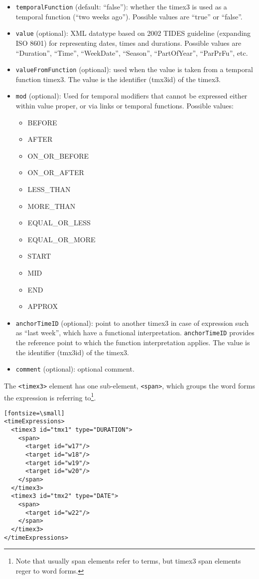 \begin{itemize}
\begin{tabular}{|c|p{9cm}|}
  \end{tabular}

\item \texttt{temporalFunction} (default: ``false''): whether the timex3 is
  used as a temporal function (``two weeks ago''). Possible values are
  ``true'' or ``false''.

\item \texttt{value} (optional): XML datatype based on 2002 TIDES guideline
  (expanding ISO 8601) for representing dates, times and durations. Possible
  values are ``Duration'', ``Time'', ``WeekDate'', ``Season'',
  ``PartOfYear'', ``ParPrFu'', etc.

\item \texttt{valueFromFunction} (optional): used when the value is taken
  from a temporal function timex3. The value is the identifier (tmx3id) of
  the timex3.

\item \texttt{mod} (optional): Used for temporal modifiers that cannot be
  expressed either within value proper, or via links or temporal
  functions. Possible values:
  \begin{itemize}
  \item BEFORE
  \item AFTER
  \item ON\_OR\_BEFORE
  \item ON\_OR\_AFTER
  \item LESS\_THAN
  \item MORE\_THAN
  \item EQUAL\_OR\_LESS
  \item EQUAL\_OR\_MORE
  \item START
  \item MID
  \item END
  \item APPROX
  \end{itemize}

\item \texttt{anchorTimeID} (optional): point to another timex3 in case of
  expression such as ``last week'', which have a functional
  interpretation. \texttt{anchorTimeID} provides the reference point to
  which the function interpretation applies. The value is the identifier
  (tmx3id) of the timex3.
\item \texttt{comment} (optional): optional comment.
\end{itemize}

The \texttt{<timex3>} element has one sub-element, \texttt{<span>}, which
groups the word forms the expression is referring to\footnote{Note that
  usually span elements refer to terms, but timex3 span elements reger to
  word forms.}.

\begin{verbatim}[fontsize=\small]
<timeExpressions>
  <timex3 id="tmx1" type="DURATION">
    <span>
      <target id="w17"/>
      <target id="w18"/>
      <target id="w19"/>
      <target id="w20"/>
    </span>
  </timex3>
  <timex3 id="tmx2" type="DATE">
    <span>
      <target id="w22"/>
    </span>
  </timex3>
</timeExpressions>
\end{verbatim}

